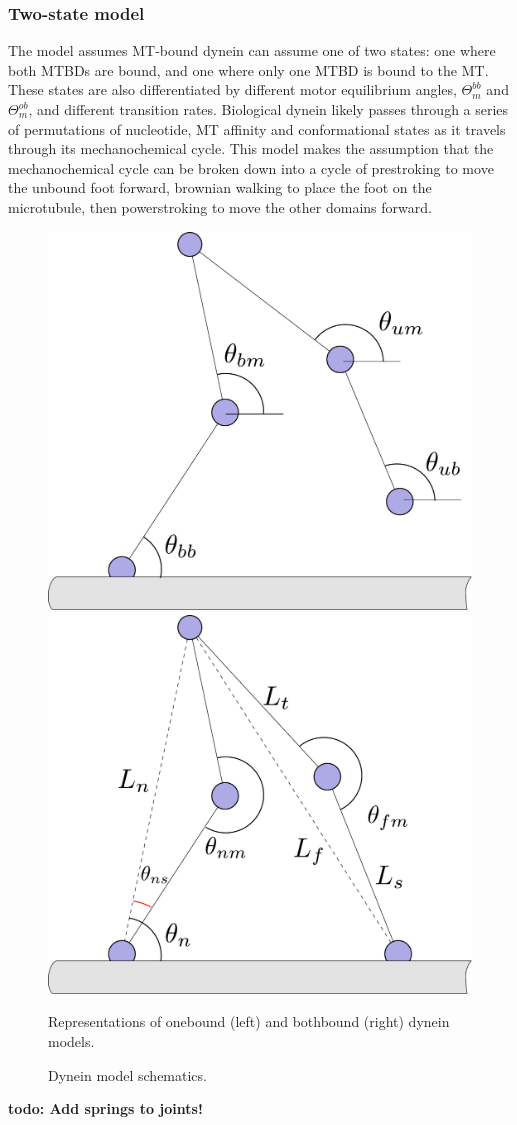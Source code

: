 \documentclass[10pt]{article} %
\begin{document}
\subsubsection{Two-state model}
The model assumes MT-bound dynein can assume one of two states: one where both MTBDs are bound, and one where only one MTBD is bound to the MT. These states are also differentiated by different motor equilibrium angles, $\Theta_{m}^{bb}$ and $\Theta_{m}^{ob}$, and different transition rates. Biological dynein likely passes through a series of permutations of nucleotide, MT affinity and conformational states as it travels through its mechanochemical cycle. This model makes the assumption that the mechanochemical cycle can be broken down into a cycle of prestroking to move the unbound foot forward, brownian walking to place the foot on the microtubule, then powerstroking to move the other domains forward.\\

\begin{figure}[h]
  \centering
  \includegraphics[width=.45\textwidth]{../../figures/code-onebound}
  \includegraphics[width=.45\textwidth]{../../figures/code-bothbound}
  \caption{Dynein model schematics.}{Representations of onebound (left) and bothbound (right) dynein models.}
  \label{ob_fig}
\end{figure}

\textbf{todo: Add springs to joints!}
\end{document}
